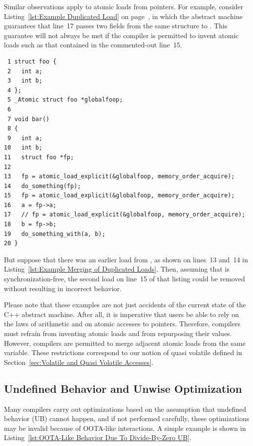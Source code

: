 \documentclass[10]{article}
\begin{document}
Similar observations apply to atomic loads from pointers.
For example, consider
Listing~\ref{lst:Example Duplicated Load} on
page~\pageref{lst:Example Duplicated Load},
in which the abstract machine guarantees that line~17 passes two
fields from the same structure to .
This guarantee will not always be met if the compiler is permitted to
invent atomic loads such as that contained in the commented-out line~15.
\begin{listing}[tbp]
\scriptsize
\begin{verbatim}
 1 struct foo {
 2   int a;
 3   int b;
 4 };
 5 _Atomic struct foo *globalfoop;
 6
 7 void bar()
 8 {
 9   int a;
10   int b;
11   struct foo *fp;
12
13   fp = atomic_load_explicit(&globalfoop, memory_order_acquire);
14   do_something(fp);
15   fp = atomic_load_explicit(&globalfoop, memory_order_acquire);
16   a = fp->a;
17   // fp = atomic_load_explicit(&globalfoop, memory_order_acquire);
18   b = fp->b;
19   do_something_with(a, b);
20 }
\end{verbatim}
\caption{Example Merging of Duplicated Loads}
\label{lst:Example Merging of Duplicated Loads}
\end{listing}
But suppose that there was an earlier load from , as
shown on lines~13 and~14 in
Listing~\ref{lst:Example Merging of Duplicated Loads}.
Then, assuming that  is synchronization-free, the
second load on line~15 of that listing could be removed without resulting
in incorrect behavior.

Please note that these examples are not just accidents of the current state
of the C++ abstract machine.
After all, it is imperative that users be able to rely on the laws of
arithmetic and on atomic accesses to pointers.
Therefore, compilers must refrain from inventing atomic loads and from repurposing
their values.
However, compilers are permitted to merge adjacent atomic loads from
the same variable.
These restrictions correspond to our notion of quasi volatile defined in
Section~\ref{sec:Volatile and Quasi Volatile Accesses}.

\subsection{Undefined Behavior and Unwise Optimization}
\label{app:Undefined Behavior and Unwise Optimization}

Many compilers carry out optimizations based on the assumption
that undefined behavior (UB) cannot happen,
and if not performed carefully, these optimizations may be invalid
because of OOTA-like interactions.
A simple example is shown in
Listing~\ref{lst:OOTA-Like Behavior Due To Divide-By-Zero UB}.
\end{document}
